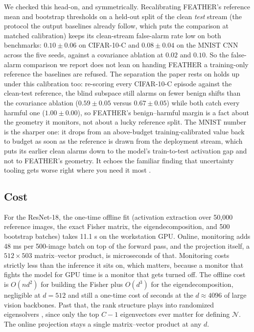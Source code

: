 \documentclass[acmsmall,screen]{acmart}
\theoremstyle{acmdefinition}
\begin{document}
We checked this head-on, and symmetrically. Recalibrating FEATHER's reference
mean and bootstrap thresholds on a held-out split of the clean \emph{test}
stream (the protocol the output baselines already follow, which puts the
comparison at matched calibration) keeps its clean-stream false-alarm rate
low on both benchmarks: $0.10 \pm 0.06$ on CIFAR-10-C and $0.08 \pm 0.04$ on
the MNIST CNN across the five seeds, against a covariance ablation at $0.02$
and $0.10$. So the false-alarm comparison we report does not lean on handing
FEATHER a training-only reference the baselines are refused. The separation
the paper rests on holds up under this calibration too: re-scoring every
CIFAR-10-C episode against the clean-test reference, the blind subspace still
alarms on fewer benign shifts than the covariance ablation ($0.59 \pm 0.05$
versus $0.67 \pm 0.05$) while both catch every harmful one ($1.00 \pm 0.00$),
so FEATHER's benign--harmful margin is a fact about the geometry it monitors,
not about a lucky reference split. The MNIST number is the sharper one: it
drops from an above-budget training-calibrated value back to budget as soon as
the reference is drawn from the deployment stream, which puts its earlier
clean alarms down to the model's train-to-test activation gap and not to
FEATHER's geometry. It echoes the familiar finding that uncertainty tooling
gets worse right where you need it most \cite{ovadia2019trust}.

\subsection{Cost}

For the ResNet-18, the one-time offline fit (activation extraction over
50{,}000 reference images, the exact Fisher matrix, the eigendecomposition,
and 500 bootstrap batches) takes 11.1 s on the workstation GPU. Online,
monitoring adds 48 ms per 500-image batch on top of the forward pass, and the
projection itself, a $512 \times 503$ matrix--vector product, is microseconds
of that. Monitoring costs strictly less than the inference it sits on, which
matters, because a monitor that fights the model for GPU time is a monitor
that gets turned off. The offline cost is $O(nd^2)$ for building the Fisher
plus $O(d^3)$ for the eigendecomposition, negligible at $d = 512$ and still a
one-time cost of seconds at the $d \approx 4096$ of large vision backbones.
Past that, the rank structure plays into randomized eigensolvers
\cite{halko2011structure}, since only the top $C-1$ eigenvectors ever matter
for defining $\mathcal{N}$. The online projection stays a single
matrix--vector product at any $d$.
\end{document}
